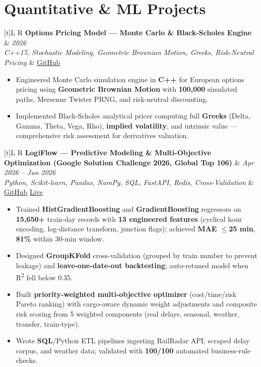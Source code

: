 \documentclass[a4paper,10pt]{article}
\newcommand{\resumeProject}[4]{%
  \vspace{0.3mm}
  \noindent
  \begin{tabularx}{\textwidth}[t]{L R}
    \textbf{#1} & \textit{#3} \\
    \textit{#2} & #4 \\
  \end{tabularx}
  \vspace{-0.3mm}%
}
\begin{document}
\section{Quantitative \& ML Projects}
\small

\resumeProject
  {Options Pricing Model --- Monte Carlo \& Black-Scholes Engine}
  {C++17, Stochastic Modeling, Geometric Brownian Motion, Greeks, Risk-Neutral Pricing}
  {2026}
  {\href{https://github.com/Ojas-Srivastava05/Options-Pricing-Model}{GitHub}}
\begin{itemize}
  \item Engineered Monte Carlo simulation engine in \textbf{C++} for European options pricing using \textbf{Geometric Brownian Motion} with \textbf{100,000} simulated paths, Mersenne Twister PRNG, and risk-neutral discounting.
  \item Implemented Black-Scholes analytical pricer computing full \textbf{Greeks} (Delta, Gamma, Theta, Vega, Rho), \textbf{implied volatility}, and intrinsic value --- comprehensive risk assessment for derivatives valuation.
\end{itemize}

\resumeProject
  {LogiFlow --- Predictive Modeling \& Multi-Objective Optimization (Google Solution Challenge 2026, Global Top 106)}
  {Python, Scikit-learn, Pandas, NumPy, SQL, FastAPI, Redis, Cross-Validation}
  {Apr 2026 -- Jun 2026}
  {\href{https://github.com/Ojas-Srivastava05/LogiFlow-Solution-Challenge-2026}{GitHub} \textbar{} \href{https://logi-flow-solution-challenge-2026.vercel.app}{Live}}
\begin{itemize}
  \item Trained \textbf{HistGradientBoosting} and \textbf{GradientBoosting} regressors on \textbf{15,650+} train-day records with \textbf{13 engineered features} (cyclical hour encoding, log-distance transform, junction flags); achieved \textbf{MAE $\leq$25 min}, \textbf{81\%} within 30-min window.
  \item Designed \textbf{GroupKFold} cross-validation (grouped by train number to prevent leakage) and \textbf{leave-one-date-out backtesting}; auto-retuned model when R\textsuperscript{2} fell below 0.35.
  \item Built \textbf{priority-weighted multi-objective optimizer} (cost/time/risk Pareto ranking) with cargo-aware dynamic weight adjustments and composite risk scoring from 5 weighted components (real delays, seasonal, weather, transfer, train-type).
  \item Wrote \textbf{SQL}/Python ETL pipelines ingesting RailRadar API, scraped delay corpus, and weather data; validated with \textbf{100/100} automated business-rule checks.
\end{itemize}
\end{document}
